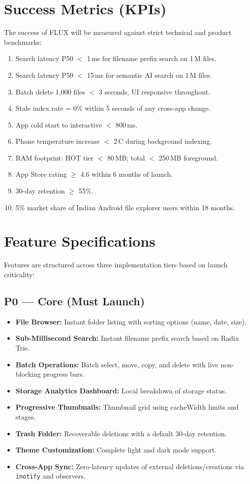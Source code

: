 \chapter{Success Metrics (KPIs)}

The success of FLUX will be measured against strict technical and product benchmarks:

\begin{enumerate}
  \item Search latency P50 $<$ 1\,ms for filename prefix search on 1\,M files.
  \item Search latency P50 $<$ 15\,ms for semantic AI search on 1\,M files.
  \item Batch delete 1,000 files $<$ 3 seconds, UI responsive throughout.
  \item Stale index rate = 0\% within 5 seconds of any cross-app change.
  \item App cold start to interactive $<$ 800\,ms.
  \item Phone temperature increase $<$ 2\,\textdegree{}C during background indexing.
  \item RAM footprint: HOT tier $<$ 80\,MB; total $<$ 250\,MB foreground.
  \item App Store rating $\geq$ 4.6 within 6 months of launch.
  \item 30-day retention $\geq$ 55\%.
  \item 5\% market share of Indian Android file explorer users within 18 months.
\end{enumerate}

\chapter{Feature Specifications}

Features are structured across three implementation tiers based on launch criticality:

\section{P0 --- Core (Must Launch)}
\begin{itemize}
  \item \textbf{File Browser:} Instant folder listing with sorting options (name, date, size).
  \item \textbf{Sub-Millisecond Search:} Instant filename prefix search based on Radix Trie.
  \item \textbf{Batch Operations:} Batch select, move, copy, and delete with live non-blocking progress bars.
  \item \textbf{Storage Analytics Dashboard:} Local breakdown of storage status.
  \item \textbf{Progressive Thumbnails:} Thumbnail grid using cacheWidth limits and stages.
  \item \textbf{Trash Folder:} Recoverable deletions with a default 30-day retention.
  \item \textbf{Theme Customization:} Complete light and dark mode support.
  \item \textbf{Cross-App Sync:} Zero-latency updates of external deletions/creations via \texttt{inotify} and observers.
\end{itemize}


